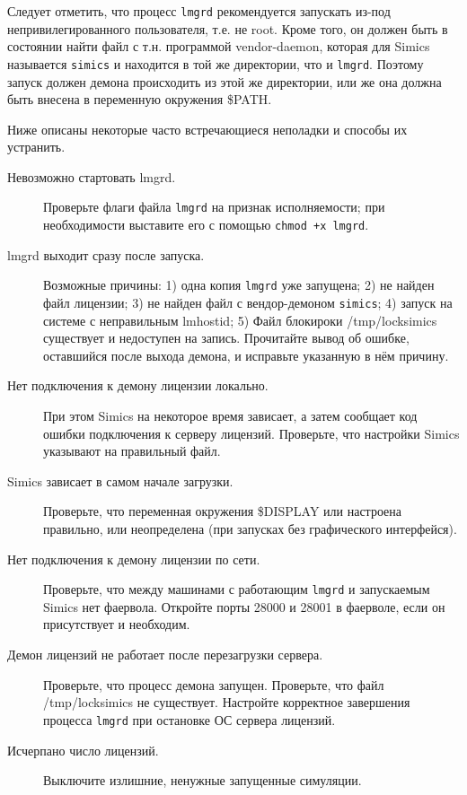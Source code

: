 Следует отметить, что процесс \texttt{lmgrd} рекомендуется запускать из-под непривилегированного пользователя, т.е. не root. Кроме того, он должен быть в состоянии найти файл с т.н. программой vendor-daemon, которая для Simics называется \texttt{simics} и находится в той же директории, что и \texttt{lmgrd}. Поэтому запуск должен демона происходить из этой же директории, или же она должна быть внесена в переменную окружения \$PATH.

Ниже описаны некоторые часто встречающиеся неполадки и способы их устранить.
\begin{description}
    \item[Невозможно стартовать lmgrd.] Проверьте флаги файла \texttt{lmgrd} на признак исполняемости; при необходимости выставите его с помощью \texttt{chmod +x lmgrd}.
    
    \item[lmgrd выходит сразу после запуска.] Возможные причины: 1) одна копия \texttt{lmgrd} уже запущена; 2) не найден файл лицензии; 3) не найден файл с вендор-демоном \texttt{simics}; 4) запуск на системе с неправильным lmhostid; 5) Файл блокироки /tmp/locksimics существует и недоступен на запись. Прочитайте вывод об ошибке, оставшийся после выхода демона, и исправьте указанную в нём причину.

    \item[Нет подключения к демону лицензии локально.] При этом Simics на некоторое время зависает, а затем сообщает код ошибки подключения к серверу лицензий. Проверьте, что настройки Simics указывают на правильный файл.
    
    \item[Simics зависает в самом начале загрузки.] Проверьте, что переменная окружения \$DISPLAY или настроена правильно, или неопределена (при запусках без графического интерфейся).
    
    \item[Нет подключения к демону лицензии по сети.]  Проверьте, что между машинами с работающим \texttt{lmgrd} и запускаемым Simics нет фаервола. Откройте порты 28000 и 28001 в фаерволе, если он присутствует и необходим.
    
    \item[Демон лицензий не работает после перезагрузки сервера.] Проверьте, что процесс демона запущен. Проверьте, что файл /tmp/locksimics не существует. Настройте корректное завершения процесса \texttt{lmgrd} при остановке ОС сервера лицензий.
    
    \item[Исчерпано число лицензий.] Выключите излишние, ненужные запущенные симуляции.
    
\end{description}

